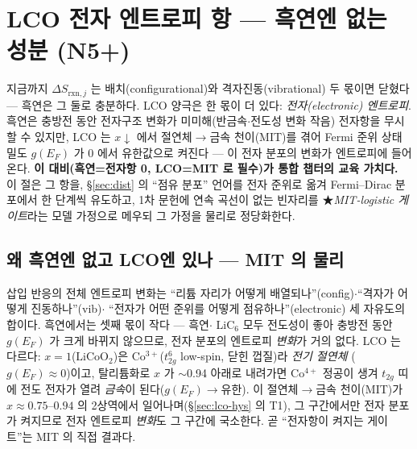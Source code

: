 \documentclass[11pt,a4paper]{article}
\newcommand{\rxn}{\mathrm{rxn}}
\begin{document}
\section{LCO 전자 엔트로피 항 — 흑연엔 없는 성분 (N5+)}\label{sec:lco-electronic}
지금까지 $\Delta S_{\rxn,j}$ 는 배치(configurational)와 격자진동(vibrational) 두 몫이면 닫혔다 — 흑연은 그 둘로 충분하다.
LCO 양극은 한 몫이 더 있다: \emph{전자(electronic) 엔트로피}. 흑연은 충방전 동안 전자구조 변화가 미미해(반금속$\cdot$전도성
변화 작음) 전자항을 무시할 수 있지만, LCO 는 $x\!\downarrow$ 에서 절연체$\to$금속 천이(MIT)를 겪어 Fermi 준위 상태밀도
$g(E_F)$ 가 $0$ 에서 유한값으로 켜진다 — 이 전자 분포의 변화가 엔트로피에 들어온다. \textbf{이 대비(흑연=전자항 0,
LCO=MIT 로 필수)가 통합 챕터의 교육 가치다.} 이 절은 그 항을, \S\ref{sec:dist} 의 ``점유 분포'' 언어를 전자 준위로
옮겨 Fermi--Dirac 분포에서 한 단계씩 유도하고, 1차 문헌에 연속 곡선이 없는 빈자리를 ★\emph{MIT-logistic 게이트}라는
모델 가정으로 메우되 그 가정을 물리로 정당화한다.

\subsection{왜 흑연엔 없고 LCO엔 있나 — MIT 의 물리}\label{sec:lco-why}
삽입 반응의 전체 엔트로피 변화는 ``리튬 자리가 어떻게 배열되나''(config)$\cdot$``격자가 어떻게 진동하나''(vib)$\cdot$
``전자가 어떤 준위를 어떻게 점유하나''(electronic) 세 자유도의 합이다. 흑연에서는 셋째 몫이 작다 — 흑연$\cdot$
$\mathrm{LiC_6}$ 모두 전도성이 좋아 충방전 동안 $g(E_F)$ 가 크게 바뀌지 않으므로, 전자 분포의 엔트로피 \emph{변화}가
거의 없다. LCO 는 다르다: $x{=}1$($\mathrm{LiCoO_2}$)은 Co$^{3+}$($t_{2g}^6$ low-spin, 닫힌 껍질)라 \emph{전기 절연체}
($g(E_F)\!\approx\!0$)이고, 탈리튬화로 $x$ 가 $\sim$0.94 아래로 내려가면 Co$^{4+}$ 정공이 생겨 $t_{2g}$ 띠에 전도 전자가
열려 \emph{금속}이 된다($g(E_F)\!\to\!$유한)\cite{menetrier1999,motohashi2009}. 이 절연체$\to$금속 천이(MIT)가 $x\approx0.75$--$0.94$
의 2상역에서 일어나며(\S\ref{sec:lco-hys} 의 T1), 그 구간에서만 전자 분포가 켜지므로 전자 엔트로피 \emph{변화}도 그
구간에 국소한다. 곧 ``전자항이 켜지는 게이트''는 MIT 의 직접 결과다.
\end{document}
